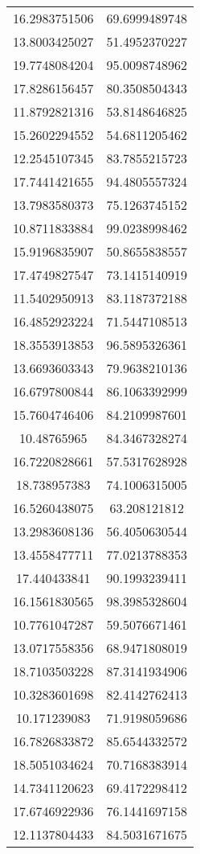 \begin{table}
\begin{tabular}{cc}
16.2983751506 & 69.6999489748 \\
13.8003425027 & 51.4952370227 \\
19.7748084204 & 95.0098748962 \\
17.8286156457 & 80.3508504343 \\
11.8792821316 & 53.8148646825 \\
15.2602294552 & 54.6811205462 \\
12.2545107345 & 83.7855215723 \\
17.7441421655 & 94.4805557324 \\
13.7983580373 & 75.1263745152 \\
10.8711833884 & 99.0238998462 \\
15.9196835907 & 50.8655838557 \\
17.4749827547 & 73.1415140919 \\
11.5402950913 & 83.1187372188 \\
16.4852923224 & 71.5447108513 \\
18.3553913853 & 96.5895326361 \\
13.6693603343 & 79.9638210136 \\
16.6797800844 & 86.1063392999 \\
15.7604746406 & 84.2109987601 \\
10.48765965 & 84.3467328274 \\
16.7220828661 & 57.5317628928 \\
18.738957383 & 74.1006315005 \\
16.5260438075 & 63.208121812 \\
13.2983608136 & 56.4050630544 \\
13.4558477711 & 77.0213788353 \\
17.440433841 & 90.1993239411 \\
16.1561830565 & 98.3985328604 \\
10.7761047287 & 59.5076671461 \\
13.0717558356 & 68.9471808019 \\
18.7103503228 & 87.3141934906 \\
10.3283601698 & 82.4142762413 \\
10.171239083 & 71.9198059686 \\
16.7826833872 & 85.6544332572 \\
18.5051034624 & 70.7168383914 \\
14.7341120623 & 69.4172298412 \\
17.6746922936 & 76.1441697158 \\
12.1137804433 & 84.5031671675 \\

\end{tabular}
\end{table}
